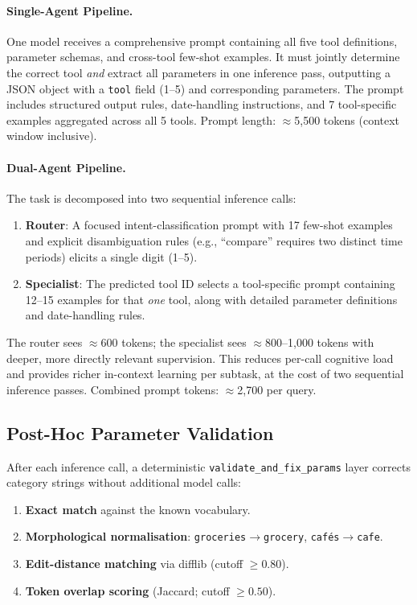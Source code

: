 \documentclass[11pt,twocolumn]{article}
\begin{document}
\paragraph{Single-Agent Pipeline.}
One model receives a comprehensive prompt containing all five tool definitions, parameter schemas, and cross-tool few-shot examples.
It must jointly determine the correct tool \emph{and} extract all parameters in one inference pass, outputting a JSON object with a \texttt{tool} field (1--5) and corresponding parameters.
The prompt includes structured output rules, date-handling instructions, and 7 tool-specific examples aggregated across all 5 tools.
Prompt length: $\approx$5,500 tokens (context window inclusive).

\paragraph{Dual-Agent Pipeline.}
The task is decomposed into two sequential inference calls:
\begin{enumerate}
    \item \textbf{Router}: A focused intent-classification prompt with 17 few-shot examples and explicit disambiguation rules (e.g., ``compare'' requires two distinct time periods) elicits a single digit (1--5).
    \item \textbf{Specialist}: The predicted tool ID selects a tool-specific prompt containing 12--15 examples for that \emph{one} tool, along with detailed parameter definitions and date-handling rules.
\end{enumerate}
The router sees $\approx$600 tokens; the specialist sees $\approx$800--1,000 tokens with deeper, more directly relevant supervision.
This reduces per-call cognitive load and provides richer in-context learning per subtask, at the cost of two sequential inference passes.
Combined prompt tokens: $\approx$2,700 per query.

\subsection{Post-Hoc Parameter Validation}
\label{sec:validation}

After each inference call, a deterministic \texttt{validate\_and\_fix\_params} layer corrects category strings without additional model calls:

\begin{enumerate}
    \item \textbf{Exact match} against the known vocabulary.
    \item \textbf{Morphological normalisation}: \texttt{groceries}$\to$\texttt{grocery}, \texttt{cafés}$\to$\texttt{cafe}.
    \item \textbf{Edit-distance matching} via difflib (cutoff $\geq 0.80$).
    \item \textbf{Token overlap scoring} (Jaccard; cutoff $\geq 0.50$).
\end{enumerate}
\end{document}
